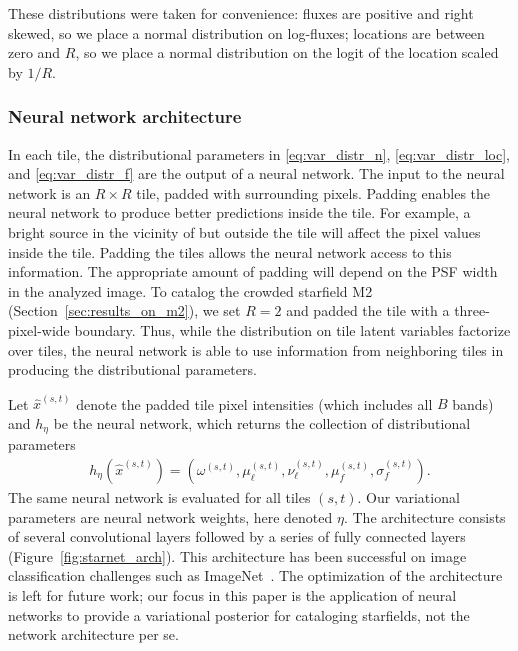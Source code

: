 These distributions were taken for convenience: fluxes are positive and right skewed, so we place a normal distribution on log-fluxes; locations are between zero and $R$, so 
we place a normal distribution on the logit of the location scaled by $1 / R$. 

\subsubsection{Neural network architecture}
\label{sec:nn_archetecture}

In each tile, the distributional parameters in \eqref{eq:var_distr_n},
\eqref{eq:var_distr_loc}, and \eqref{eq:var_distr_f} are the output of a neural network. 
The input to the neural network is an $R \times R$ tile, padded with surrounding pixels.
Padding enables the neural network to produce better predictions inside the tile. 
For example, a bright source in the vicinity of but outside the tile will affect the pixel values inside the tile. 
Padding the tiles allows the neural network access to this information. 
The appropriate amount of padding will depend on the PSF width in the analyzed image. 
To catalog the crowded starfield M2 (Section~\ref{sec:results_on_m2}),
we set $R = 2$ and padded the tile with a three-pixel-wide boundary.
Thus, while the distribution on tile latent variables factorize over tiles, the neural network is able to use information from neighboring tiles in producing the distributional parameters. 


Let $\hat x^{(s,t)}$ denote the padded tile pixel intensities (which includes all $B$ bands) and $h_\eta$ be the neural network, which returns the collection of distributional parameters
\begin{align}
    h_\eta(\hat x^{(s,t)}) = (\omega^{(s,t)}, \mu_\ell^{(s,t)}, \nu_{\ell}^{(s,t)}, \mu_f^{(s,t)}, \sigma^{(s,t)}_f).
    \label{eq:nn_output}
\end{align}
The same neural network is evaluated for all tiles $(s,t)$. Our variational parameters are neural network weights, here denoted $\eta$. 
The architecture consists of several convolutional layers followed by a series of fully connected layers (Figure~\ref{fig:starnet_arch}). 
This architecture has been successful on image classification challenges such as ImageNet~\citep{imagenet2015}. 
The optimization of the architecture is left for future work; our focus in this paper is the application of neural networks to provide a variational posterior for cataloging starfields, not the network architecture per se. 


